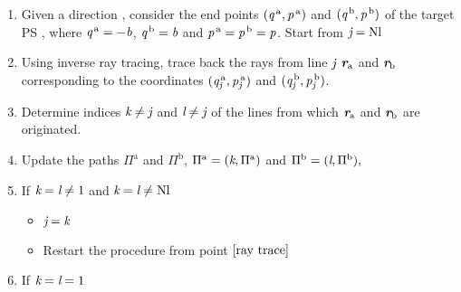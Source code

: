 \begin{enumerate}
\item Given a direction , consider the end points $(\textit{q}^{\,\textrm{a}}, \textit{p}^{\,\textrm{a}})$ and $(\textit{q}^{\,\textrm{b}}, \textit{p}^{\,\textrm{b}})$ of the target PS , where $\textit{q}^{\,\textrm{a}} = -\textit{b}$, $\textit{q}^{\,\textrm{b}} = \textit{b}$ and $\textit{p}^{\,\textrm{a}} = \textit{p}^{\,\textrm{b}} = \textit{p}$. Start from $\textit{j}=\textrm{Nl}$
\item \label{ray trace} Using inverse ray tracing, trace back the rays from line $\textit{j}$ $\textit{\textbf{r}}_{\textrm{a}}$ and $\textit{\textbf{r}}_\textrm{b}$ corresponding to the coordinates  $(\textit{q}_{\textit{j}}^{\,\textrm{a}}, \textit{p}_{\textit{j}}^{\,\textrm{a}})$ and $ (\textit{q}_{\textit{j}}^{\,\textrm{b}}, \textit{p}_{\textit{j}}^{\,\textrm{b}})$. 
\item Determine indices $\textit{k}\neq\textit{j}$ and $\textit{l}\neq\textit{j}$ of the lines from which  $\textit{\textbf{r}}_{\textrm{a}}$ and $\textit{\textbf{r}}_{\textrm{b}}$ are originated.\\
\item Update the paths $\Pi^\textrm{a}$ and $\Pi^\textrm{b}$, $\Pi^\textrm{a} = (\textit{k}, \Pi^{\textrm{a}})$ and $\Pi^\textrm{b} = (\textit{l}, \Pi^\textrm{b}),$
\item If $\textit{k}=\textit{l} \neq 1$ and $\textit{k}=\textit{l} \neq \textrm{Nl}$
\begin{itemize}
\item $\textit{j}=\textit{k}$
\item Restart the procedure from point $\ref{ray trace}$
\end{itemize}
\item If $\textit{k}=\textit{l}= 1$ 
\begin{itemize}

\end{itemize}
\end{enumerate}
